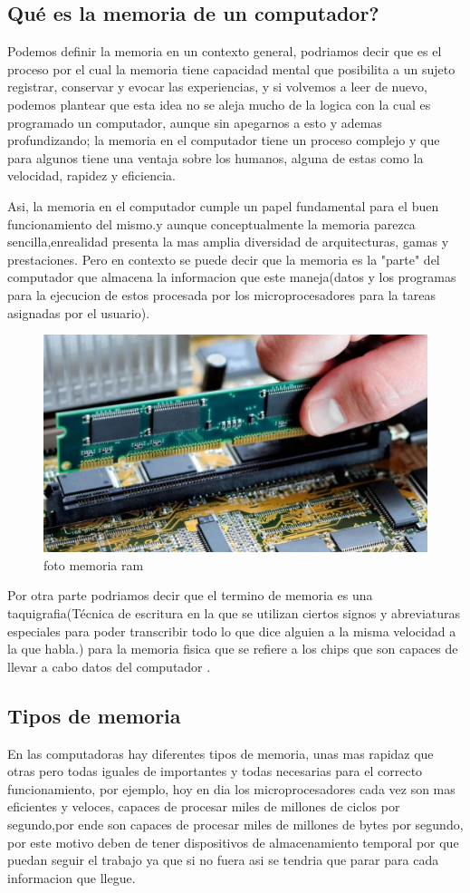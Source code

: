 \documentclass{article}
\begin{document}
    \subsection{Qué es la memoria de un computador?}
    Podemos definir la memoria en un contexto general, podriamos decir que es el proceso por el cual la memoria tiene capacidad mental que posibilita a un sujeto registrar, conservar y evocar las experiencias\cite{hipocampo}, y si volvemos a leer de nuevo, podemos plantear que esta idea no se aleja mucho de la logica con la cual es programado un computador, aunque sin apegarnos a esto y ademas profundizando; la memoria en el computador tiene un proceso complejo y que para algunos tiene una ventaja sobre los humanos, alguna de estas como la velocidad, rapidez y eficiencia.
    
    Asi, la memoria en el computador cumple un papel fundamental para el buen funcionamiento del mismo.y aunque conceptualmente la memoria parezca sencilla,enrealidad presenta la mas amplia diversidad de arquitecturas, gamas y prestaciones\cite{academia}.
    Pero en contexto se puede decir que la memoria es la "parte" del computador que almacena la informacion que este maneja(datos y los programas para la ejecucion de estos procesada por los microprocesadores para la tareas asignadas por el usuario).\cite{academia}

    \begin{figure}[h]
    \includegraphics[width=6 cm]{imagenes/tipo_memoria.jpg}
    \centering
    \caption{foto memoria ram}
    \label{fig:tipo_memoria}
    \end{figure}

    Por otra parte podriamos decir que el termino de memoria es una taquigrafia(Técnica de escritura en la que se utilizan ciertos signos y abreviaturas especiales para poder transcribir todo lo que dice alguien a la misma velocidad a la que habla.) para la memoria fisica que se refiere a los chips que son capaces de llevar a cabo datos del computador \cite{monografias}.
    
    \subsection{Tipos de memoria}
    En las computadoras hay diferentes tipos de memoria, unas mas rapidaz que otras pero todas iguales de importantes y todas necesarias para el correcto funcionamiento, por ejemplo, hoy en dia los microprocesadores cada vez son mas eficientes y veloces, capaces de procesar miles de millones de ciclos por segundo,por ende son capaces de procesar miles de millones de bytes por segundo, por este motivo deben de tener dispositivos de almacenamiento temporal por que puedan seguir el trabajo ya que si no fuera asi se tendria que parar para cada informacion que llegue.\cite{profe}
    
\end{document}
